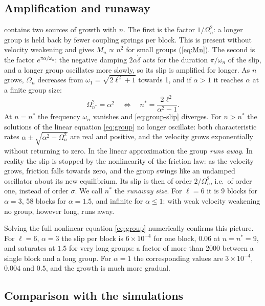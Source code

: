 \subsection{Amplification and runaway}

 contains two sources of growth with $n$. The first is the factor $1/\Omega_n^2$: a longer group is held back by fewer coupling springs per
block. This is present without velocity weakening and gives $M_n\propto n^2$ for small groups (\cref{eq:Mn}). The second is the factor $e^{\pi\alpha/\omega_n}$:
the negative damping $2\alpha\dot\delta$ acts for the duration $\pi/\omega_n$ of the slip, and a longer group oscillates more slowly, so its slip is amplified
for longer. As $n$ grows, $\Omega_n$ decreases from $\omega_1 = \sqrt{2\ell^2+1}$ towards 1, and if $\alpha>1$ it reaches $\alpha$ at a finite group size:
\begin{equation}
  \Omega_{n^*}^2 = \alpha^2\quad\Longleftrightarrow\quad n^* = \frac{2\ell^2}{\alpha^2-1}.
  \label{eq:nstar}
\end{equation}
At $n = n^*$ the frequency $\omega_n$ vanishes and \cref{eq:group-slip} diverges. For $n>n^*$ the solutions of the linear equation \cref{eq:group} no longer
oscillate: both characteristic rates $\alpha\pm\sqrt{\alpha^2-\Omega_n^2}$ are real and positive, and the velocity grows exponentially without returning to
zero. In the linear approximation the group \emph{runs away}. In reality the slip is stopped by the nonlinearity of the friction law: as the velocity grows, friction
falls towards zero, and the group swings like an undamped oscillator about its new equilibrium. Its slip is then of order $2/\Omega_n^2$, i.e.\ of order one,
instead of order $\sigma$. We call $n^*$ the \emph{runaway size}. For $\ell = 6$ it is 9 blocks for $\alpha = 3$, 58 blocks for $\alpha=1.5$, and infinite
for $\alpha\le1$: with weak velocity weakening no group, however long, runs away.

Solving the full nonlinear equation \cref{eq:group} numerically confirms this picture. For $\ell=6$, $\alpha=3$ the slip per block is $6\times10^{-4}$ for one
block, $0.06$ at $n = n^* = 9$, and saturates at $1.5$ for very long groups: a factor of more than 2000 between a single block and a long group. For $\alpha = 1$ the
corresponding values are $3\times10^{-4}$, $0.004$ and $0.5$, and the growth is much more gradual.

\subsection{Comparison with the simulations}

